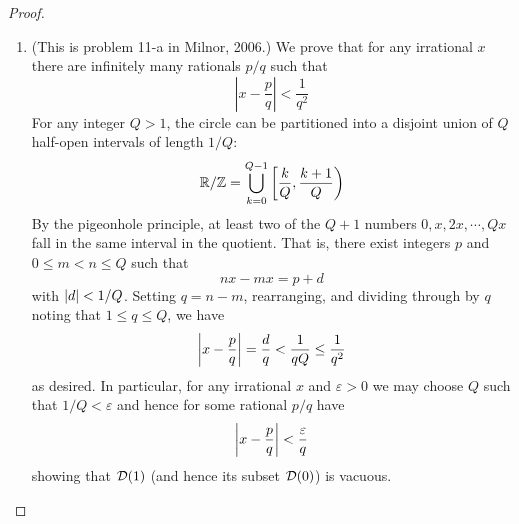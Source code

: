 \documentclass[../main.tex]{subfiles}
\begin{document}
\begin{proof}
\begin{enumerate}
    \item (This is problem 11-a in Milnor, 2006.)
    We prove that for any irrational $x$ there are infinitely many rationals $p/q$ such that
    \[
        \left|{x - \frac{p}{q}}\right| < \frac{1}{q^2}
    \]
    For any integer $Q > 1$, the circle can be partitioned into a disjoint union of $Q$ half-open intervals of length $1/Q$:
    \[
    \mathbb{R}/\mathbb{Z} = \bigcup\limits_{k = 0}^{Q-1} \left[\frac{k}{Q}, \frac{k+1}{Q}\right)
    \]
    By the pigeonhole principle, at least two of the $Q+1$ numbers $0, x, 2x, \cdots, Qx$ fall in the same interval in the quotient. That is, there exist integers $p$ and $0 \le m < n \le Q$ such that
    \[
    nx - mx = p + d
    \]
    with $\left|d\right| < 1/Q$. Setting $q = n - m$, rearranging, and dividing through by $q$ noting that $1 \le q \le Q$, we have
    \[
    \left|x - \frac{p}{q}\right| = \frac{d}{q} < \frac{1}{qQ} \le \frac{1}{q^2}
    \]
    as desired. In particular, for any irrational $x$ and $\varepsilon > 0$ we may choose $Q$ such that $1/Q < \varepsilon$ and hence for some rational $p/q$ have
    \[
    \left|x - \frac{p}{q}\right| < \frac{\varepsilon}{q}
    \]
    showing that $\mathcal{D}(1)$ (and hence its subset $\mathcal{D}(0)$) is vacuous.
\end{enumerate}
\end{proof}
\end{document}
